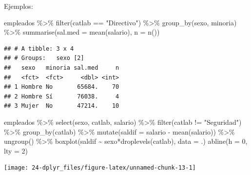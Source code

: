 \documentclass[
]{book}
\newenvironment{Shaded}{\begin{snugshade}}{\end{snugshade}}
\newcommand{\AttributeTok}[1]{\textcolor[rgb]{0.77,0.63,0.00}{#1}}
\newcommand{\DecValTok}[1]{\textcolor[rgb]{0.00,0.00,0.81}{#1}}
\newcommand{\FunctionTok}[1]{\textcolor[rgb]{0.00,0.00,0.00}{#1}}
\newcommand{\NormalTok}[1]{#1}
\newcommand{\SpecialCharTok}[1]{\textcolor[rgb]{0.00,0.00,0.00}{#1}}
\newcommand{\StringTok}[1]{\textcolor[rgb]{0.31,0.60,0.02}{#1}}
\theoremstyle{break}
\theoremstyle{nonumberplain}
\begin{document}
Ejemplos:

\begin{Shaded}
\begin{Highlighting}[]
\NormalTok{empleados }\SpecialCharTok{\%\textgreater{}\%}  \FunctionTok{filter}\NormalTok{(catlab }\SpecialCharTok{==} \StringTok{"Directivo"}\NormalTok{) }\SpecialCharTok{\%\textgreater{}\%}
          \FunctionTok{group\_by}\NormalTok{(sexo, minoria) }\SpecialCharTok{\%\textgreater{}\%}
          \FunctionTok{summarise}\NormalTok{(}\AttributeTok{sal.med =} \FunctionTok{mean}\NormalTok{(salario), }\AttributeTok{n =} \FunctionTok{n}\NormalTok{())}
\end{Highlighting}
\end{Shaded}

\begin{verbatim}
## # A tibble: 3 x 4
## # Groups:   sexo [2]
##   sexo   minoria sal.med     n
##   <fct>  <fct>     <dbl> <int>
## 1 Hombre No       65684.    70
## 2 Hombre Sí       76038.     4
## 3 Mujer  No       47214.    10
\end{verbatim}

\begin{Shaded}
\begin{Highlighting}[]
\NormalTok{empleados }\SpecialCharTok{\%\textgreater{}\%} \FunctionTok{select}\NormalTok{(sexo, catlab, salario) }\SpecialCharTok{\%\textgreater{}\%}
          \FunctionTok{filter}\NormalTok{(catlab }\SpecialCharTok{!=} \StringTok{"Seguridad"}\NormalTok{) }\SpecialCharTok{\%\textgreater{}\%}
          \FunctionTok{group\_by}\NormalTok{(catlab) }\SpecialCharTok{\%\textgreater{}\%}
          \FunctionTok{mutate}\NormalTok{(}\AttributeTok{saldif =}\NormalTok{ salario }\SpecialCharTok{{-}} \FunctionTok{mean}\NormalTok{(salario)) }\SpecialCharTok{\%\textgreater{}\%}
          \FunctionTok{ungroup}\NormalTok{() }\SpecialCharTok{\%\textgreater{}\%}
          \FunctionTok{boxplot}\NormalTok{(saldif }\SpecialCharTok{\textasciitilde{}}\NormalTok{ sexo}\SpecialCharTok{*}\FunctionTok{droplevels}\NormalTok{(catlab), }\AttributeTok{data =}\NormalTok{ .)}
\FunctionTok{abline}\NormalTok{(}\AttributeTok{h =} \DecValTok{0}\NormalTok{, }\AttributeTok{lty =} \DecValTok{2}\NormalTok{)}
\end{Highlighting}
\end{Shaded}

\begin{center}\texttt{[image: 24-dplyr\_files/figure-latex/unnamed-chunk-13-1]} \end{center}
\end{document}
